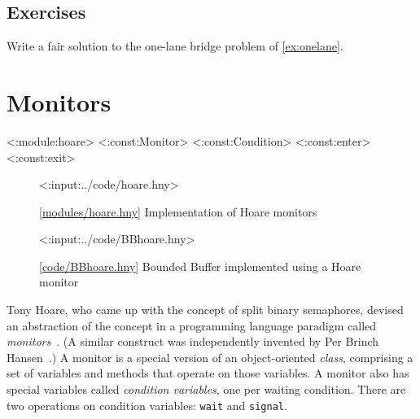 \documentclass{report}
\newcommand{\harmonylink}[1]{%
[\href{https://harmony.cs.cornell.edu/#1}{\underline{#1}}]%
}
\newenvironment{code}{
\tcolorbox
}{
\endtcolorbox
}
\begin{document}
{

\section*{Exercises}
\begin{problems}
\item Write a fair solution to the one-lane bridge problem of
\autoref{ex:onelane}.
\end{problems}

\chapter{Monitors}
\label{ch:monitors}

<{:module:hoare}>
<{:const:Monitor}>
<{:const:Condition}>
<{:const:enter}>
<{:const:exit}>

%
%

\begin{figure}
\begin{code}
<{:input:../code/hoare.hny}>
\end{code}
\caption{\harmonylink{modules/hoare.hny} Implementation of Hoare monitors}
\label{fig:hoare}
\end{figure}

\begin{figure}
\begin{code}
<{:input:../code/BBhoare.hny}>
\end{code}
\caption{\harmonylink{code/BBhoare.hny} Bounded Buffer implemented using
a Hoare monitor}
\label{fig:hoaretest}
\end{figure}

Tony Hoare, who came up with the concept of split binary semaphores, devised
an abstraction of the concept in a programming language paradigm called
\emph{monitors}~\cite{Hoare74}.
%
(A similar construct was independently invented by Per Brinch Hansen~\cite{BH73}.)
A monitor is a special version of an object-oriented \emph{class}, comprising
a set of variables and methods that operate on those variables.
A monitor also has special variables called \emph{condition variables},
one per waiting condition.
There are two operations on condition variables: \texttt{wait}
%
and
\texttt{signal}.
%

}
\end{document}

